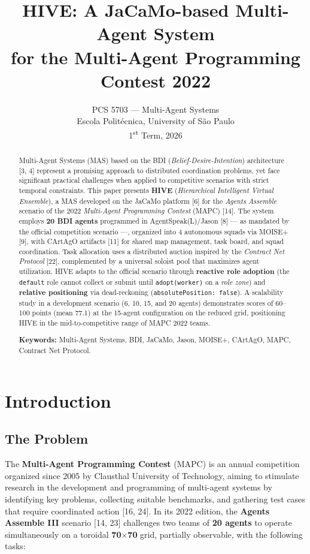\documentclass[11pt,a4paper]{article}
\title{\textbf{HIVE: A JaCaMo-based Multi-Agent System\\ for the Multi-Agent Programming Contest 2022}}
\author{PCS 5703 --- Multi-Agent Systems \\
        Escola Politécnica, University of São Paulo \\
        1\textsuperscript{st} Term, 2026}
\date{}
\newcommand{\code}[1]{\texttt{#1}}
\begin{document}
\maketitle

\begin{abstract}
\noindent Multi-Agent Systems (MAS) based on the BDI (\emph{Belief-Desire-Intention}) architecture [3, 4] represent a promising approach to distributed coordination problems, yet face significant practical challenges when applied to competitive scenarios with strict temporal constraints. This paper presents \textbf{HIVE} (\emph{Hierarchical Intelligent Virtual Ensemble}), a MAS developed on the JaCaMo platform [6] for the \emph{Agents Assemble} scenario of the 2022 \emph{Multi-Agent Programming Contest} (MAPC) [14]. The system employs \textbf{20 BDI agents} programmed in AgentSpeak(L)/Jason [8] --- as mandated by the official competition scenario ---, organized into 4 autonomous squads via MOISE+ [9], with CArtAgO artifacts [11] for shared map management, task board, and squad coordination. Task allocation uses a distributed auction inspired by the \emph{Contract Net Protocol} [22], complemented by a universal soloist pool that maximizes agent utilization. HIVE adapts to the official scenario through \textbf{reactive role adoption} (the \code{default} role cannot collect or submit until \code{adopt(worker)} on a \emph{role zone}) and \textbf{relative positioning} via dead-reckoning (\code{absolutePosition: false}). A scalability study in a development scenario (6, 10, 15, and 20 agents) demonstrates scores of 60--100 points (mean 77.1) at the 15-agent configuration on the reduced grid, positioning HIVE in the mid-to-competitive range of MAPC 2022 teams.

\medskip
\noindent\textbf{Keywords:} Multi-Agent Systems, BDI, JaCaMo, Jason, MOISE+, CArtAgO, MAPC, Contract Net Protocol.
\end{abstract}

\section{Introduction}

\subsection{The Problem}
The \textbf{Multi-Agent Programming Contest} (MAPC) is an annual competition organized since 2005 by Clausthal University of Technology, aiming to stimulate research in the development and programming of multi-agent systems by identifying key problems, collecting suitable benchmarks, and gathering test cases that require coordinated action [16, 24]. In its 2022 edition, the \textbf{Agents Assemble III} scenario [14, 23] challenges two teams of \textbf{20 agents} to operate simultaneously on a toroidal \textbf{70$\times$70} grid, partially observable, with the following tasks:
\end{document}
